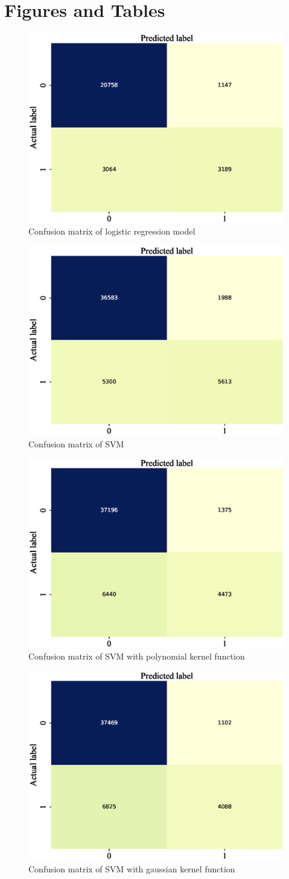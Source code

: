 \documentclass[11pt, a4paper, jou]{apa7}
\begin{document}
\printbibliography 
\clearpage
\appendix
\section{Figures and Tables}
\begin{figure}[h]
    \centering
    \caption{Confusion matrix of logistic regression model}\label{fig:logistic_confusion}
    \includegraphics[width=.45\textwidth]{figures/Logit_confusion_matrix.eps}
\end{figure}

\begin{figure}[h]
    \centering
    \caption{Confusion matrix of SVM}\label{fig:SVM_confusion}
    \includegraphics[width=.45\textwidth]{figures/SVM_confusion_matrix.eps}
\end{figure}

\begin{figure}[h]
    \centering
    \caption{Confusion matrix of SVM with polynomial kernel function}\label{fig:SVM_poly_confusion}
    \includegraphics[width=.45\textwidth]{figures/SVM_poly_confusion_matrix.eps}
\end{figure}

\begin{figure}[h]
    \centering
    \caption{Confusion matrix of SVM with gaussian kernel function}\label{fig:SVM_gauss_confusion}
    \includegraphics[width=.45\textwidth]{figures/SVM_gauss_confusion_matrix.eps}
\end{figure}
\end{document}
